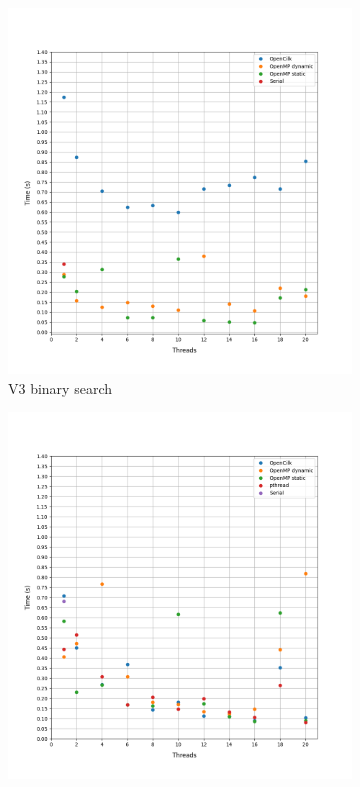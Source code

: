 \documentclass[12pt, a4paper]{article}
\begin{document}
\begin{figure}[h!]
     \begin{subfigure}[b]{0.33\textwidth}
         \centering
         \includegraphics[height=.4\textheight, width=\textwidth, keepaspectratio]{assets/NACA0015/v3.png}
    \caption{V3 binary search}
     \end{subfigure}
     \hfill
     \begin{subfigure}[b]{0.33\textwidth}
         \centering
         \includegraphics[height=.4\textheight, width=\textwidth, keepaspectratio]{assets/NACA0015/v4_binary.png}

\end{subfigure}
\end{figure}
\end{document}
